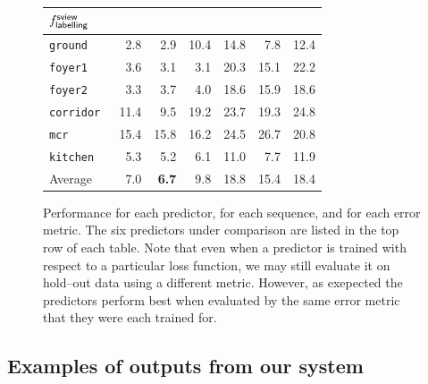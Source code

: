 \begin{figure}[h]
{\begin{tabular}{@{}p{20mm}rrrrrr@{}}
      \hspace{3mm} $f^{\textsf{sview}}_{\textsf{labelling}}$ &
      \hspace{6mm} \cite{Flint10eccv} \\
    \midrule
      \tt{ground}     &   2.8 &   2.9 &  10.4 &  14.8 &   7.8 &  12.4 \\
      \tt{foyer1}     &   3.6 &   3.1 &   3.1 &  20.3 &  15.1 &  22.2 \\
      \tt{foyer2}     &   3.3 &   3.7 &   4.0 &  18.6 &  15.9 &  18.6 \\
      \tt{corridor}   &  11.4 &   9.5 &  19.2 &  23.7 &  19.3 &  24.8 \\
      \tt{mcr}        &  15.4 &  15.8 &  16.2 &  24.5 &  26.7 &  20.8 \\
      \tt{kitchen}    &   5.3 &   5.2 &   6.1 &  11.0 &   7.7 &  11.9 \\
    \midrule
      Average         &   7.0 &   \textbf{6.7} &   9.8 &  18.8 &  15.4 &  18.4 \\
    \bottomrule
  \end{tabular}
}

\caption{Performance for each predictor, for each sequence, and for
  each error metric. The six predictors under comparison are listed in
  the top row of each table. Note that even when a predictor is
  trained with respect to a particular loss function, we may still
  evaluate it on hold--out data using a different metric. However, as
  exepected the predictors perform best when evaluated by the same
  error metric that they were each trained for.}
  \label{fig:performance}
\end{figure}


\subsection{Examples of outputs from our system}

\newcommand{\CompFrame}[3]{
  \texttt{[image: figures\_addendum/examples/\#1\_frame\#2\_\#3.jpg]}
}

\newcommand{\MviewRow}[2]{
  \CompFrame{#1}{#2}{mview_depth} &
  \CompFrame{#1}{#2}{mview_lbl} &
  \CompFrame{#1}{#2}{iccv} &
  \CompFrame{#1}{#2}{gt}
}

\newcommand{\SviewRow}[2]{
  \CompFrame{#1}{#2}{sview_depth} &
  \CompFrame{#1}{#2}{sview_lbl} &
  \CompFrame{#1}{#2}{eccv} &
  \CompFrame{#1}{#2}{gt}
}


